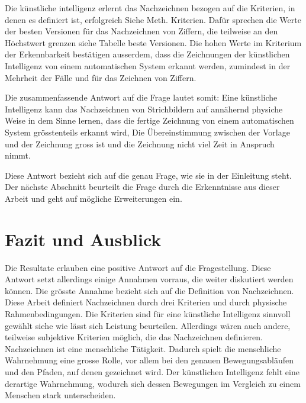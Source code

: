 Die künstliche intelligenz erlernt das Nachzeichnen bezogen auf die Kriterien,
in denen es definiert ist, erfolgreich {Siehe Meth. Kriterien}. Dafür sprechen
die Werte der besten Versionen für das Nachzeichnen von Ziffern, die teilweise
an den Höchstwert grenzen {siehe Tabelle beste Versionen}. Die hohen Werte im
Kriterium der Erkennbarkeit bestätigen ausserdem, dass die Zeichnungen der
künstlichen Intelligenz von einem automatischen System erkannt werden, zumindest
in der Mehrheit der Fälle und für das Zeichnen von Ziffern.


Die zusammenfassende Antwort auf die Frage lautet somit: Eine künstliche
Intelligenz kann das Nachzeichnen von Strichbildern auf annähernd physiche Weise
in dem Sinne lernen, dass die fertige Zeichnung von einem automatischen System
grösstenteils erkannt wird, Die Übereinstimmung zwischen der Vorlage und der
Zeichnung gross ist und die Zeichnung nicht viel Zeit in Anspruch nimmt.

Diese Antwort bezieht sich auf die genau Frage, wie sie in der Einleitung steht.
Der nächste Abschnitt beurteilt die Frage durch die Erkenntnisse aus dieser
Arbeit und geht auf mögliche Erweiterungen ein.



\section{Fazit und Ausblick}
Die Resultate erlauben eine positive Antwort auf die Fragestellung. Diese
Antwort setzt allerdings einige Annahmen vorraus, die weiter diskutiert werden
können. Die grösste Annahme bezieht sich auf die Definition von Nachzeichnen.
Diese Arbeit definiert Nachzeichnen durch drei Kriterien und durch physische
Rahmenbedingungen. Die Kriterien sind für eine künstliche Intelligenz sinnvoll
gewählt {siehe wie lässt sich Leistung beurteilen}. Allerdings wären auch
andere, teilweise subjektive Kriterien möglich, die das Nachzeichnen definieren.
Nachzeichnen ist eine menschliche Tätigkeit. Dadurch spielt die menschliche
Wahrnehmung eine grosse Rolle, vor allem bei den genauen Bewegungsabläufen und
den Pfaden, auf denen gezeichnet wird. Der künstlichen Intelligenz fehlt eine
derartige Wahrnehmung, wodurch sich dessen Bewegungen im Vergleich zu einem
Menschen stark unterscheiden.


